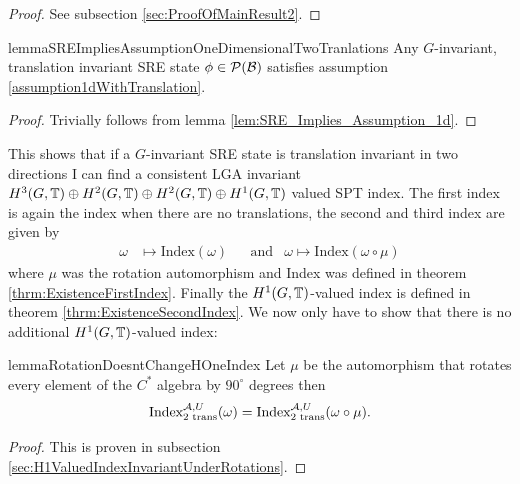 \documentclass[12pt,a4paper,twoside]{article}
\numberwithin{equation}{section}
\begin{document}
\begin{proof}
	See subsection \ref{sec:ProofOfMainResult2}.
\end{proof}
\begin{restatable}{lemma}{SREImpliesAssumptionOneDimensionalTwoTranlations}\label{lem:SRE_Implies_Assumption_1dTwoTranslations}
	Any $G$-invariant, translation invariant SRE state $\phi\in\PP(\BB)$ satisfies assumption \ref{assumption1dWithTranslation}.
\end{restatable}
\begin{proof}
	Trivially follows from lemma \ref{lem:SRE_Implies_Assumption_1d}.
\end{proof}
This shows that if a $G$-invariant SRE state is translation invariant in two directions I can find a consistent LGA invariant $H^3(G,\TT)\oplus H^2(G,\TT)\oplus H^2(G,\TT)\oplus H^1(G,\TT)$ valued SPT index. The first index is again the index when there are no translations, the second and third index are given by
\begin{align}
	\omega&\mapsto \textrm{Index}(\omega)&&\text{and}&\omega\mapsto \textrm{Index}(\omega\circ\mu)
\end{align}
where $\mu$ was the rotation automorphism and Index was defined in theorem \ref{thrm:ExistenceFirstIndex}. Finally the $H^1(G,\TT)$-valued index is defined in theorem \ref{thrm:ExistenceSecondIndex}. We now only have to show that there is no additional $H^1(G,\TT)$-valued index:
\begin{restatable}{lemma}{RotationDoesntChangeHOneIndex}\label{lem:RotationDoesn'tChangeH1Index}
	Let $\mu$ be the automorphism that rotates every element of the $C^*$ algebra by $90^\circ$ degrees then
	\begin{equation}
		\textrm{Index}_{\text{2 trans}}^{\AA,U}(\omega)=\textrm{Index}_{\text{2 trans}}^{\AA,U}(\omega\circ\mu).
	\end{equation}
\end{restatable}
\begin{proof}
	This is proven in subsection \ref{sec:H1ValuedIndexInvariantUnderRotations}.
\end{proof}
\end{document}
